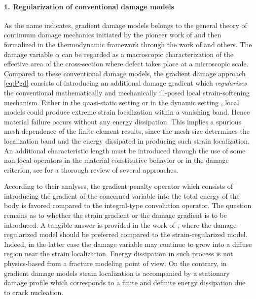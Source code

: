 \paragraph{1. Regularization of conventional damage models} As the name indicates, gradient damage models belongs to the general theory of continuum damage mechanics initiated by the pioneer work of \cite{Kachanov:1958} and then formalized in the thermodynamic framework through the work of \cite{LemaitreChaboche:1978} and others. The damage variable $\alpha$ can be regarded as a macroscopic characterization of the effective area of the cross-section where defect takes place at a microscopic scale. Compared to these conventional damage models, the gradient damage approach \eqref{eq:Pgd} consists of introducing an additional damage gradient which \emph{regularizes} the conventional mathematically and mechanically ill-posed local strain-softening mechanism. Either in the quasi-static setting \cite{Benallal:1993} or in the dynamic setting \cite{Bazant:1985aa}, local models could produce extreme strain localization within a vanishing band. Hence material failure occurs without any energy dissipation. This implies a spurious mesh dependence of the finite-element results, since the mesh size determines the localization band and the energy dissipated in producing such strain localization. An additional characteristic length must be introduced through the use of some non-local operators in the material constitutive behavior or in the damage criterion, see \cite{LorentzAndrieux:2003} for a thorough review of several approaches.

According to their analyses, the gradient penalty operator which consists of introducing the gradient of the concerned variable into the total energy of the body is favored compared to the integral-type convolution operator. The question remains as to whether the strain gradient or the damage gradient is to be introduced. A tangible answer is provided in the work of \cite{LeMauriniMarigoVidoli:2015}, where the damage-regularized model should be preferred compared to the strain-regularized model. Indeed, in the latter case the damage variable may continue to grow into a diffuse region near the strain localization. Energy dissipation in such process is not physics-based from a fracture modeling point of view. On the contrary, in gradient damage models strain localization is accompanied by a stationary damage profile which corresponds to a finite and definite energy dissipation due to crack nucleation.

